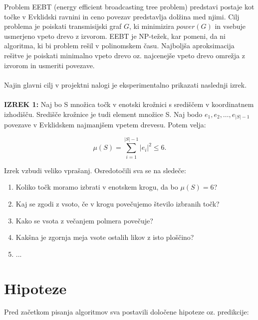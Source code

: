 \documentclass[a4paper]{article}
\begin{document}
Problem EEBT (energy efficient broadcasting tree problem) predstavi postaje kot točke v Evklidski ravnini in ceno povezav predstavlja dolžina med njimi. Cilj problema je poiskati transmisijski graf $G$, ki minimizira $power(G)$ in vsebuje usmerjeno vpeto drevo z izvorom. EEBT je NP-težek, kar pomeni, da ni algoritma, ki bi problem rešil v polinomskem času. Najboljša aproksimacija rešitve je poiskati minimalno vpeto drevo oz. najcenejše vpeto drevo omrežja z izvorom in usmeriti povezave.
\\
\\
Najin glavni cilj v projektni nalogi je eksperimentalno prikazati naslednji izrek.\\
\\
\textbf{IZREK 1:} Naj bo S množica točk v enotski krožnici s središčem v koordinatnem izhodišču. Središče krožnice je tudi element množice S. Naj bodo $e_1, e_2, \ldots, e_{|S|-1}$ povezave v Evklidskem najmanjšem vpetem drevesu. Potem velja: 

$$ \mu (S) = \sum_{i=1}^{|S|-1} |e_i|^2 \leq 6. $$

Izrek vzbudi veliko vprašanj. Osredotočili sva se na sledeče:
\begin{enumerate}
\item Koliko točk moramo izbrati v enotskem krogu, da bo $\mu (S) = 6$?
\item Kaj se zgodi z vsoto, če v krogu povečujemo število izbranih točk?
\item Kako se vsota z večanjem polmera povečuje?
\item Kakšna je zgornja meja vsote ostalih likov z isto ploščino?
\item ...
\end{enumerate}

\section{Hipoteze}

Pred začetkom pisanja algoritmov sva postavili določene hipoteze oz. predikcije:
\end{document}
